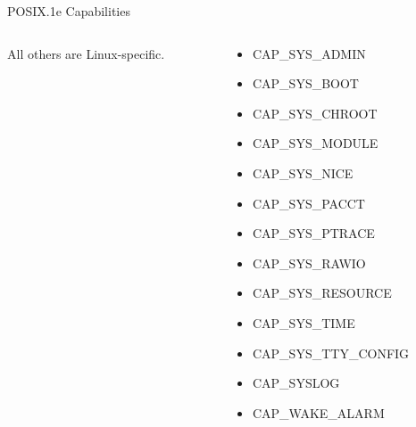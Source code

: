 \documentclass[mathserif,xcolor={dvipsnames,table}]{beamer}
\begin{document}
\begin{frame}{POSIX.1e Capabilities}
{\begin{columns}
\begin{column}{.33\textwidth}
\begin{itemize}
\end{itemize}
All others are Linux-specific.
\end{column}
\begin{column}{.33\textwidth}
\begin{itemize}
\item CAP\_SYS\_ADMIN
\item CAP\_SYS\_BOOT
\item CAP\_SYS\_CHROOT
\item CAP\_SYS\_MODULE
\item CAP\_SYS\_NICE
\item CAP\_SYS\_PACCT
\item CAP\_SYS\_PTRACE
\item CAP\_SYS\_RAWIO
\item CAP\_SYS\_RESOURCE
\item CAP\_SYS\_TIME
\item CAP\_SYS\_TTY\_CONFIG
\item CAP\_SYSLOG
\item CAP\_WAKE\_ALARM
\end{itemize}
\end{column}
\end{columns}
}
\end{frame}
\end{document}
